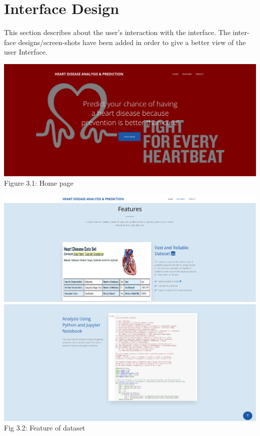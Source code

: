 \documentclass{book}
\begin{document}
    	\section{Interface Design}
    	This section describes about the user’s interaction with the interface. The inter-face designs/screen-shots have been added in order to give a better view of the user Interface.
    	
    	\begin{center}
    			\includegraphics[width=17cm]{images/home.png}
    			Figure 3.1: Home page
    			
    			
    			\includegraphics[width=17cm]{images/features}
    			\includegraphics[width=17cm]{images/feature-analysis}
    			Fig 3.2: Feature of dataset
    			\pagebreak
    			

\end{center}
\end{document}
